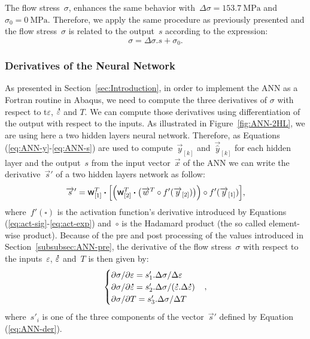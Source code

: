 \documentclass[algorithms,article,submit,pdftex,oneauthors]{Definitions/mdpi}
\DeclareRobustCommand{\w}{\mbox{\large\ensuremath{\mathsf{w}}}}
\DeclareRobustCommand{\dotp}{\boldsymbol{\cdot}}
\DeclareRobustCommand{\lay}[1]{_{[#1]}}
\DeclareRobustCommand{\mdot}[1]{\accentset{\mbox{\bfseries .}}{#1}}
\DeclareRobustCommand{\MPa}{\text{MPa}}
\begin{document}
\textcolor{greencolor}{The flow stress~$\sigma$, enhances the same behavior with~$\Delta\sigma=153.7~\MPa$ and~$\sigma_{0}=0~\MPa$.}
\textcolor{greencolor}{Therefore, we apply the same procedure as previously presented and the flow stress~$\sigma$ is related to the output~$s$ according to the expression:}
\begin{equation}
\sigma = \Delta\sigma.s + \sigma_{0}.\label{eq:ANN-output}
\end{equation}

\subsubsection{Derivatives of the Neural Network}\label{subsubsec:ANN-der}

\textcolor{greencolor}{As presented in Section~\ref{sec:Introduction}, in order to implement the ANN as a Fortran routine in Abaqus, we need to compute the three derivatives of $\sigma$ with respect to t$\varepsilon$, $\mdot{\varepsilon}$ and $T$.}
\textcolor{greencolor}{We can compute those derivatives using differentiation of the output with respect to the inputs.}
As illustrated in Figure~\ref{fig:ANN-2HL}, we are using here a two hidden layers neural network.
Therefore, as Equations (\ref{eq:ANN-y}-\ref{eq:ANN-s}) are used to compute~$\overrightarrow{y}\lay{k}$ and~$\overrightarrow{\hat{y}}\lay{k}$ for each hidden layer and the output~$s$ from the input vector~$\overrightarrow{x}$ of the ANN we can write the derivative~$\overrightarrow{s}'$ of a two hidden layers network as follow:
\begin{equation}
\overrightarrow{s}' = \w\lay{1}^T \dotp\left[\left(\w\lay{2}^T \dotp \left(\overrightarrow{w}^T \circ f'(\overrightarrow{y}\lay{2})\right)\right) \circ f'(\overrightarrow{y}\lay{1})\right] \label{eq:ANN-der},
\end{equation}
\textcolor{greencolor}{where~$f'\left(\square\right)$ is the activation function's derivative introduced by Equations (\ref{eq:act-sig}-\ref{eq:act-exp}) and~$\circ$ is the Hadamard product (the so called element-wise product).}
Because of the pre and post processing of the values introduced in Section~\ref{subsubsec:ANN-pre}, the derivative of the flow stress~$\sigma$ with respect to the inputs~$\varepsilon$, $\mdot{\varepsilon}$ and~$T$ is then given by:
\begin{equation}
\begin{cases}
\partial \sigma/\partial \varepsilon = s'_{1}.\Delta\sigma / \Delta\varepsilon\\
\partial \sigma/\partial\mdot{\varepsilon} = s'_{2}.\Delta\sigma / (\mdot{\varepsilon}.\Delta\mdot{\varepsilon})\\
\partial \sigma/\partial T = s'_{3}.\Delta\sigma / \Delta T
\end{cases}
\label{eq:ANN-der2},
\end{equation}
where~$s'_i$ is one of the three components of the vector~$\overrightarrow{s}'$ defined by Equation (\ref{eq:ANN-der}).
\end{document}
